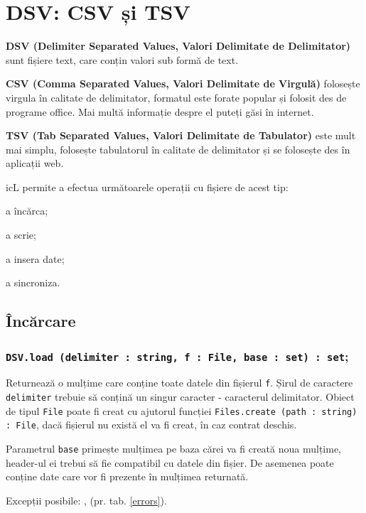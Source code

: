 \section{DSV: CSV și TSV}

{\bf DSV (Delimiter Separated Values, Valori Delimitate de Delimitator)} sunt fișiere text, care conțin valori sub formă de text.

{\bf CSV (Comma Separated Values, Valori Delimitate de Virgulă)} folosește virgula în calitate de delimitator, formatul este forate popular și folosit des de programe office. Mai multă informație despre el puteți găsi în internet.

{\bf TSV (Tab Separated Values, Valori Delimitate de Tabulator)} este mult mai simplu, folosește tabulatorul în calitate de delimitator și se folosește des în aplicații web.

icL permite a efectua următoarele operații cu fișiere de acest tip:
\begin{icItems}
	\item a încărca;
	\item a scrie;
	\item a insera date;
	\item a sincroniza.
\end{icItems}

\subsection{Încărcare}

\subsubsection{\texttt{DSV.load (delimiter : string, f : File, base : set) : set};}

Returnează o mulțime care conține toate datele din fișierul \texttt{f}. Șirul de caractere \texttt{delimiter} trebuie să conțină un singur caracter - caracterul delimitator. Obiect de tipul \texttt{File} poate fi creat cu ajutorul funcției \texttt{Files.create (path : string) : File}, dacă fișierul nu există el va fi creat, în caz contrat deschis.

Parametrul \texttt{base} primește mulțimea pe baza cărei va fi creată noua mulțime, header-ul ei trebui să fie compatibil cu datele din fișier. De asemenea poate conține date care vor fi prezente în mulțimea returnată.

Excepții posibile: ,  (pr. tab. \ref{errors}).

